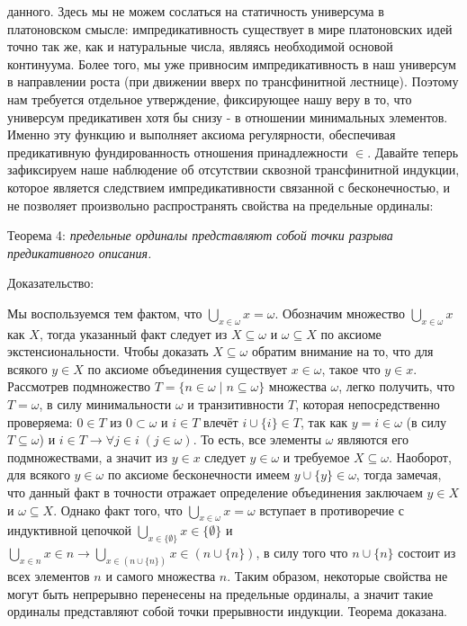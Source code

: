 \documentclass[12pt]{article}
\begin{document}
данного. Здесь мы не можем сослаться на статичность универсума в платоновском смысле: импредикативность существует в мире платоновских идей точно так же, как и натуральные числа, являясь необходимой основой континуума. Более того, мы уже привносим импредикативность в наш универсум в направлении роста (при движении вверх по трансфинитной лестнице). Поэтому нам требуется отдельное утверждение, фиксирующее нашу веру в то, что универсум предикативен хотя бы снизу - в отношении минимальных элементов. Именно эту функцию и выполняет аксиома регулярности, обеспечивая предикативную фундированность отношения принадлежности $\in$. Давайте теперь зафиксируем наше наблюдение об отсутствии сквозной трансфинитной индукции, которое является следствием импредикативности связанной с бесконечностью, и не позволяет произвольно распространять свойства на предельные ординалы:

Теорема 4: {\sl предельные ординалы представляют собой точки разрыва предикативного описания.}

Доказательство: 

Мы воспользуемся тем фактом, что $\bigcup\limits_{ x \in \omega } x = \omega$. Обозначим множество $\bigcup\limits_{ x \in \omega } x$ как $X$, тогда указанный факт следует из $X \subseteq \omega$ и $\omega \subseteq X$ по аксиоме экстенсиональности. Чтобы доказать $X \subseteq \omega$ обратим внимание на то, что для всякого $y \in X$ по аксиоме объединения существует $x \in \omega$, такое что $y \in x$. Рассмотрев подмножество $T = \{ n \in \omega \mid n \subseteq \omega \}$ множества $\omega$, легко получить, что $T = \omega$, в силу минимальности $\omega$ и транзитивности $T$, которая непосредственно проверяема: $0 \in T$ из $0 \subset \omega$ и $i \in T$ влечёт $i \cup \{ i \} \in T$, так как $y = i \in \omega$ (в силу $T \subseteq \omega$) и $i \in T \to \forall j \in i \; (j \in \omega)$. То есть, все элементы $\omega$ являются его подмножествами, а значит из $y \in x$ следует $y \in \omega$ и требуемое $X \subseteq \omega$. Наоборот, для всякого $y \in \omega$ по аксиоме бесконечности имеем $y \cup \{ y \} \in \omega$, тогда замечая, что данный факт в точности отражает определение объединения заключаем $y \in X$ и $\omega \subseteq X$. Однако факт того, что $\bigcup\limits_{ x \in \omega } x = \omega$ вступает в противоречие с индуктивной цепочкой $\bigcup\limits_{ x \in \{ \emptyset \} } x \in \{ \emptyset \}$ и $\bigcup\limits_{ x \in n } x \in n \to \bigcup\limits_{ x \in (n \cup \{ n \}) } x \in (n \cup \{ n \})$, в силу того что $n \cup \{ n \}$ состоит из всех элементов $n$ и самого множества $n$. Таким образом, некоторые свойства не могут быть непрерывно перенесены на предельные ординалы, а значит такие ординалы представляют собой точки прерывности индукции. Теорема доказана.
\end{document}
